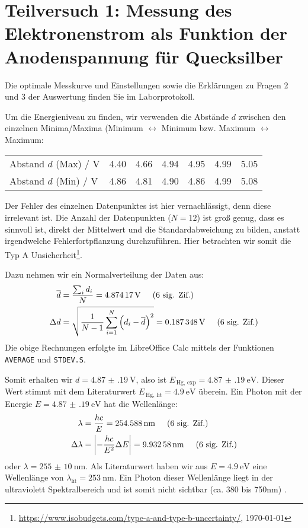\section{Teilversuch 1: Messung des Elektronenstrom als Funktion der Anodenspannung für Quecksilber}
	Die optimale Messkurve und Einstellungen sowie die Erklärungen zu Fragen 2 und 3 der Auswertung finden Sie im Laborprotokoll.

	Um die Energieniveau zu finden, wir verwenden die Abstände $d$ zwischen den einzelnen Minima/Maxima (Minimum $\leftrightarrow$ Minimum bzw. Maximum $\leftrightarrow$ Maximum:

	\begin{center}
		\begin{tabular}{l | *{6}{r}}
			\toprule
			Abstand $d$ (Max) / \si{\volt} & \num{4.40} & \num{4.66} & \num{4.94} & \num{4.95} & \num{4.99} & \num{5.05} \\
			Abstand $d$ (Min) / \si{\volt} & \num{4.86} & \num{4.81} & \num{4.90} & \num{4.86} & \num{4.99} & \num{5.08} \\
			\bottomrule
		\end{tabular}
	\end{center}

	Der Fehler des einzelnen Datenpunktes ist hier vernachlässigt, denn diese irrelevant ist. Die Anzahl der Datenpunkten ($N = 12$) ist groß genug, dass es sinnvoll ist, direkt der Mittelwert und die Standardabweichung zu bilden, anstatt irgendwelche Fehlerfortpflanzung durchzuführen. Hier betrachten wir somit die Typ A Unsicherheit\footnote{\url{https://www.isobudgets.com/type-a-and-type-b-uncertainty/}, \today}.

	Dazu nehmen wir ein Normalverteilung der Daten aus:
	\begin{align}
		\overline{d} &= \frac{\sum_i{d_i}}{N} = \SI{4.87417}{\volt} \hspace{0.5cm}\text{(6 sig. Zif.)}\\
		\Delta d &= \sqrt{\frac{1}{N-1} \sum_{i=1}^N \left(d_i - \overline{d}\right)^2} = \SI{0.187348}{\volt} \hspace{0.5cm}\text{(6 sig. Zif.)}
	\end{align}
	Die obige Rechnungen erfolgte im LibreOffice Calc mittels der Funktionen \texttt{AVERAGE} und \texttt{STDEV.S}. 

	Somit erhalten wir $d = \SI{4.87(19)}{\volt}$, also ist $E_{\,\text{Hg, exp}} = \SI{4.87(19)}{\electronvolt}$. Dieser Wert stimmt mit dem Literaturwert $E_{\,\text{Hg, lit}} = \SI{4.9}{\electronvolt}$ überein.
	\newpage
	Ein Photon mit der Energie $E = \SI{4.87(19)}{\electronvolt}$ hat die Wellenlänge:
	\begin{align}
		\lambda &= \frac{hc}{E} = \SI{254.588}{\nano\meter} \hspace{0.5cm}\text{(6 sig. Zif.)} \\
		\Delta \lambda &= \abs{-\frac{hc}{E^2}\Delta E} = \SI{9.93258}{\nano\meter} \hspace{0.5cm}\text{(6 sig. Zif.)}
	\end{align}
	oder $\lambda = \SI{255(10)}{\nano\meter}$. Als Literaturwert haben wir aus $E = \SI{4.9}{\electronvolt}$ eine Wellenlänge von $\lambda_\text{lit} = \SI{253}{\nano\meter}$. Ein Photon dieser Wellenlänge liegt in der ultraviolett Spektralbereich und ist somit nicht sichtbar (ca. \num{380} bis \num{750}\si{\nano\meter}) \citep{starr_biology_2006}. 

